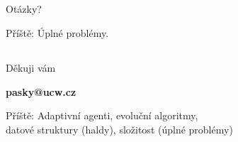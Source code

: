 \documentclass{beamer}
\begin{document}
\subsection{}
\begin{frame}{Otázky?}
\begin{center}
Příště: Úplné problémy.
\end{center}
\end{frame}

\subsection{}
\begin{frame}{Děkuji vám}
\begin{center}
{\bf pasky@ucw.cz}

Příště: Adaptivní agenti, evoluční algoritmy, \\ datové struktury (haldy), složitost (úplné problémy)
\end{center}
\end{frame}
\end{document}
